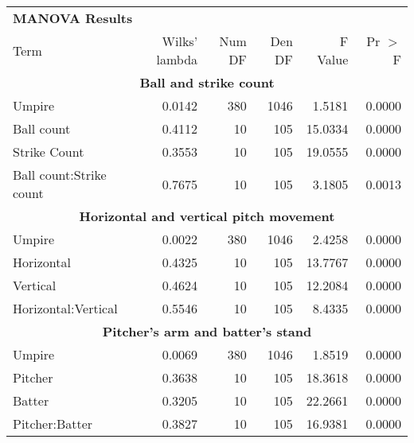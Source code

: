 \begin{table}[t!]
\centering\small
\begin{tabular}{lrrrrr}
\toprule
\multicolumn{6}{l}{\textbf{MANOVA Results}}\\\addlinespace
                    Term & Wilks' lambda & Num DF &   Den DF &  F Value &  Pr $>$ F \\
\midrule
\multicolumn{6}{c}{\textbf{Ball and strike count}}\\\addlinespace
                  Umpire &        0.0142 &    380 &     1046 &   1.5181 &  0.0000 \\
              Ball count &        0.4112 &     10 &      105 &  15.0334 &  0.0000 \\
            Strike Count &        0.3553 &     10 &      105 &  19.0555 &  0.0000 \\
 Ball count:Strike count &        0.7675 &     10 &      105 &   3.1805 &  0.0013 \\
\midrule
\multicolumn{6}{c}{\textbf{Horizontal and vertical pitch movement}}\\\addlinespace
                  Umpire &        0.0022 &    380 &     1046 &   2.4258 &  0.0000 \\
              Horizontal &        0.4325 &     10 &      105 &  13.7767 &  0.0000 \\
                Vertical &        0.4624 &     10 &      105 &  12.2084 &  0.0000 \\
     Horizontal:Vertical &        0.5546 &     10 &      105 &   8.4335 &  0.0000 \\
\midrule
\multicolumn{6}{c}{\textbf{Pitcher's arm and batter's stand}}\\\addlinespace
                  Umpire &        0.0069 &    380 &     1046 &   1.8519 &  0.0000 \\
                 Pitcher &        0.3638 &     10 &      105 &  18.3618 &  0.0000 \\
                  Batter &        0.3205 &     10 &      105 &  22.2661 &  0.0000 \\
          Pitcher:Batter &        0.3827 &     10 &      105 &  16.9381 &  0.0000 \\

\end{tabular}
\end{table}
